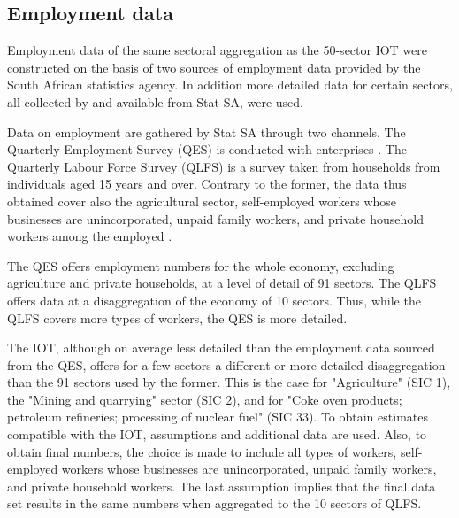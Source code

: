 \documentclass[12pt,english]{article}
\begin{document}
\subsection{Employment data}
Employment data of the same sectoral aggregation as the 50-sector IOT were constructed on the basis of two sources of employment data provided by the South African statistics agency. In addition more detailed data for certain sectors, all collected by and available from Stat SA, were used.
 
Data on employment are gathered by Stat SA through two channels. The Quarterly Employment Survey (QES) is conducted with enterprises \citep{QES2018}. The Quarterly Labour Force Survey (QLFS) is a survey taken from households from individuals aged 15 years and over. Contrary to the former, the data thus obtained cover also the agricultural sector, self-employed workers whose businesses are unincorporated, unpaid family workers, and private household workers among the employed \citep{QLFS2018}.

The QES offers employment numbers for the whole economy, excluding agriculture and private households, at a level of detail of 91 sectors. The QLFS offers data at a disaggregation of the economy of 10 sectors. Thus, while the QLFS covers more types of workers, the QES is more detailed.

The IOT, although on average less detailed than the employment data sourced from the QES, offers for a few sectors a different or more detailed disaggregation than the 91 sectors used by the former. This is the case for "Agriculture" (SIC 1), the "Mining and quarrying" sector (SIC 2), and for "Coke oven products; petroleum refineries; processing of nuclear fuel" (SIC 33). To obtain estimates compatible with the IOT, assumptions and additional data are used. Also, to obtain final numbers, the choice is made to include all types of workers, self-employed workers whose businesses are unincorporated, unpaid family workers, and private household workers. The last assumption implies that the final data set results in the same numbers when aggregated to the 10 sectors of QLFS. 

%
%
%
\end{document}

